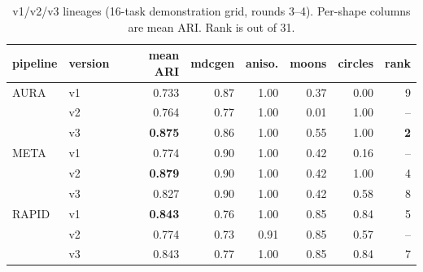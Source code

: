 \documentclass[11pt,a4paper]{article}
\begin{document}
\begin{table}[t]
  \centering\small
  \caption{v1/v2/v3 lineages (16-task demonstration grid, rounds 3--4).
  Per-shape columns are mean ARI. Rank is out of 31.}
  \label{tab:lineage}
  \begin{tabular}{llrrrrrr}
    \toprule
    pipeline & version & mean ARI & mdcgen & aniso. & moons & circles & rank \\
    \midrule
    AURA & v1 & 0.733 & 0.87 & 1.00 & 0.37 & 0.00 & 9 \\
         & v2 & 0.764 & 0.77 & 1.00 & 0.01 & 1.00 & -- \\
         & v3 & \textbf{0.875} & 0.86 & 1.00 & 0.55 & 1.00 & \textbf{2} \\
    \midrule
    META & v1 & 0.774 & 0.90 & 1.00 & 0.42 & 0.16 & -- \\
         & v2 & \textbf{0.879} & 0.90 & 1.00 & 0.42 & 1.00 & 4 \\
         & v3 & 0.827 & 0.90 & 1.00 & 0.42 & 0.58 & 8 \\
    \midrule
    RAPID & v1 & \textbf{0.843} & 0.76 & 1.00 & 0.85 & 0.84 & 5 \\
          & v2 & 0.774 & 0.73 & 0.91 & 0.85 & 0.57 & -- \\
          & v3 & 0.843 & 0.77 & 1.00 & 0.85 & 0.84 & 7 \\
    \bottomrule
  \end{tabular}
\end{table}
\end{document}
